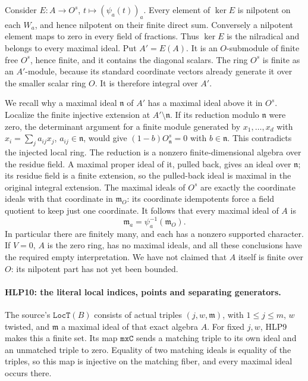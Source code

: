 Consider \(E:A\to O^s\), \(t\mapsto(\psi_a(t))_a\).
Every element of \(\ker E\) is nilpotent on each \(W_a\), and
hence nilpotent on their finite direct sum. Conversely a nilpotent
element maps to zero in every field of fractions. Thus \(\ker E\)
is the nilradical and belongs to every maximal ideal. Put
\(A'=E(A)\). It is an \(O\)-submodule of finite free \(O^s\), hence
finite, and it contains the diagonal scalars. The ring \(O^s\) is
finite as an \(A'\)-module, because its standard coordinate vectors
already generate it over the smaller scalar ring \(O\). It is
therefore integral over \(A'\).

We recall why a maximal ideal \(\mathfrak n\) of \(A'\) has a
maximal ideal above it in \(O^s\). Localize the finite injective
extension at \(A'\setminus\mathfrak n\). If its reduction modulo
\(\mathfrak n\) were zero, the determinant argument for a finite
module generated by \(x_1,\ldots,x_d\) with
\(x_i=\sum_j a_{ij}x_j\), \(a_{ij}\in\mathfrak n\), would give
\((1-b)O^s_{\mathfrak n}=0\) with \(b\in\mathfrak n\).
This contradicts the injected local ring. The reduction is a
nonzero finite-dimensional algebra over the residue field. A
maximal proper ideal of it, pulled back, gives an ideal over
\(\mathfrak n\); its residue field is a finite extension, so the
pulled-back ideal is maximal in the original integral extension.
The maximal ideals of \(O^s\) are exactly the coordinate ideals
with that coordinate in \(\mathfrak m_O\): its coordinate
idempotents force a field quotient to keep just one coordinate.
It follows that every maximal ideal of \(A\) is
\[
              \mathfrak m_a=\psi_a^{-1}(\mathfrak m_O). \tag{HLP.8}
\]
In particular there are finitely many, and each has a nonzero
supported character. If \(V=0\), \(A\) is the zero ring, has no
maximal ideals, and all these conclusions have the required empty
interpretation. We have not claimed that \(A\) itself is finite
over \(O\): its nilpotent part has not yet been bounded.

\paragraph{HLP10: the literal local indices, points and separating generators.}
\label{claim:HLP10}
The source's \(\texttt{LocT}(B)\) consists of actual triples
\((j,w,\mathfrak m)\), with \(1\le j\le m\), \(w\) twisted,
and \(\mathfrak m\) a maximal ideal of that exact algebra \(A\).
For fixed \(j,w\), HLP9 makes this a finite set. Its map
\(\texttt{mxC}\) sends a matching triple to its own ideal and
an unmatched triple to zero. Equality of two matching ideals is
equality of the triples, so this map is injective on the matching
fiber, and every maximal ideal occurs there.

